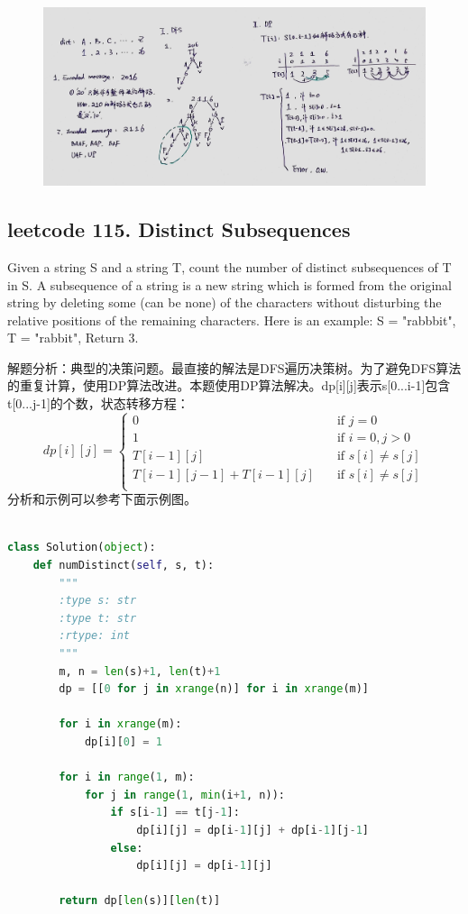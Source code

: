 \documentclass[a4paper,10pt]{article}
\begin{document}
\begin{figure}[h]
\includegraphics[width=\textwidth]{leetcode91.jpg}
\centering \\
\end{figure}




\subsection{leetcode 115. Distinct Subsequences}
Given a string S and a string T, count the number of distinct subsequences of T in S. A subsequence of a string is a new string which is formed from the original string by deleting some (can be none) of the characters without disturbing the relative positions of the remaining characters. Here is an example: S = "rabbbit", T = "rabbit", Return 3. \\

\begin{CJK*}{UTF8}{gbsn}
\noindent 解题分析：典型的决策问题。最直接的解法是DFS遍历决策树。为了避免DFS算法的重复计算，使用DP算法改进。本题使用DP算法解决。dp[i][j]表示s[0...i-1]包含t[0...j-1]的个数，状态转移方程：
\[ dp[i][j] =
  \begin{cases}
    0  & \quad \text{if } j=0\\
    1  & \quad \text{if } i=0, j>0\\
    T[i-1][j]  & \quad \text{if } s[i] \neq s[j]\\
    T[i-1][j-1]+T[i-1][j]  & \quad \text{if } s[i] \neq s[j]\\
  \end{cases}
\]
分析和示例可以参考下面示例图。
\end{CJK*}

\begin{lstlisting}[language=Python, caption=Problem115. Distinct Subsequences]

class Solution(object):
    def numDistinct(self, s, t):
        """
        :type s: str
        :type t: str
        :rtype: int
        """
        m, n = len(s)+1, len(t)+1
        dp = [[0 for j in xrange(n)] for i in xrange(m)]
        
        for i in xrange(m):
            dp[i][0] = 1
        
        for i in range(1, m):
            for j in range(1, min(i+1, n)):
                if s[i-1] == t[j-1]:
                    dp[i][j] = dp[i-1][j] + dp[i-1][j-1]
                else:
                    dp[i][j] = dp[i-1][j]
        
        return dp[len(s)][len(t)]
\end{lstlisting}
\end{document}
